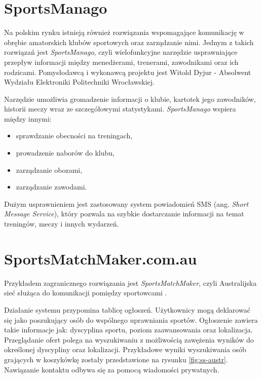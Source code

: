 \section{SportsManago}

Na polskim rynku istnieją również rozwiązania wspomagające komunikację w obrębie amatorskich klubów sportowych oraz zarządzanie nimi. Jednym z takich rozwiązań jest \textit{SportsManago}, czyli wielofunkcyjne narzędzie usprawniające przepływ informacji między menedżerami, trenerami, zawodnikami oraz ich rodzicami. Pomysłodawcą i wykonawcą projektu jest Witold Dyjur - Absolwent Wydziału Elektroniki Politechniki Wrocławskiej.

Narzędzie umożliwia gromadzenie informacji o klubie, kartotek jego zawodników, historii meczy wraz ze szczegółowymi statystykami. \textit{SportsManago} wspiera między innymi: 

\begin{itemize}
    \item sprawdzanie obecności na treningach,
    \item prowadzenie naborów do klubu,
    \item zarządzanie obozami,
    \item zarządzanie zawodami.
\end{itemize}

Dużym usprawnieniem jest zastosowany system powiadomień SMS (ang. \textit{Short Message Service}), który pozwala na szybkie dostarczanie informacji na temat treningów, meczy i innych wydarzeń.




\section{SportsMatchMaker.com.au}

Przykładem zagranicznego rozwiązania jest \textit{SportsMatchMaker}, czyli Australijska sieć służąca do komunikacji pomiędzy sportowcami \cite{smmau}. 

Działanie systemu przypomina tablicę ogłoszeń. Użytkownicy mogą deklarować się jako poszukujący osób do wspólnego uprawniania sportów. Ogłoszenie zawiera takie informacje jak: dyscyplina sportu, poziom zaawansowania oraz lokalizacja. Przeglądanie ofert polega na wyszukiwaniu z możliwością zawężenia wyników do określonej dyscypliny oraz lokalizacji. Przykładowe wyniki wyszukiwania osób grających w koszykówkę zostały przedstawione na rysunku \ref{fig:ss-austr}. Nawiązanie kontaktu odbywa się za pomocą wiadomości prywatnych.


